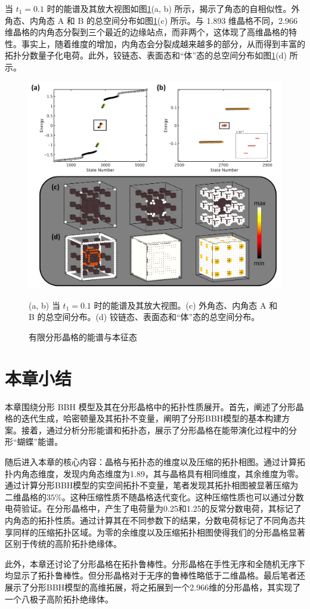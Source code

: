 当 \( t_1=0.1 \) 时的能谱及其放大视图如图\ref{fig:3DState}(a, b) 所示，揭示了角态的自相似性。外角态、内角态 A 和 B 的总空间分布如图\ref{fig:3DState}(c) 所示。与 1.893 维晶格不同，2.966 维晶格的内角态分裂到三个最近的边缘站点，而非两个，这体现了高维晶格的特性。事实上，随着维度的增加，内角态会分裂成越来越多的部分，从而得到丰富的拓扑分数量子化电荷。此外，铰链态、表面态和“体”态的总空间分布如图\ref{fig:3DState}(d) 所示。
\begin{figure}[htbp]
    \centering
    \includegraphics[width=0.75\linewidth]{figure/HOTITheo/3DState.png}
    \caption{有限分形晶格的能谱与本征态}(a, b) 当 \( t_1=0.1 \) 时的能谱及其放大视图。(c) 外角态、内角态 A 和 B 的总空间分布。(d) 铰链态、表面态和“体”态的总空间分布。
    \label{fig:3DState}
\end{figure}

\section{本章小结}
本章围绕分形 BBH 模型及其在分形晶格中的拓扑性质展开。首先，阐述了分形晶格的迭代生成，哈密顿量及其拓扑不变量，阐明了分形BBH模型的基本构建方案。接着，通过分析分形能谱和拓扑态，展示了分形晶格在能带演化过程中的分形“蝴蝶”能谱。

随后进入本章的核心内容：晶格与拓扑态的维度以及压缩的拓扑相图。通过计算拓扑内角态维度，发现内角态维度为1.89，其与晶格具有相同维度，其余维度为零。通过计算分形BBH模型的实空间拓扑不变量，笔者发现其拓扑相图被显著压缩为二维晶格的$35\%$。这种压缩性质不随晶格迭代变化。这种压缩性质也可以通过分数电荷验证。在分形晶格中，产生了电荷量为0.25和1.25的反常分数电荷，其标记了内角态的拓扑性质。通过计算其在不同参数下的结果，分数电荷标记了不同角态共享同样的压缩拓扑区域。为零的余维度以及压缩拓扑相图使得我们的分形晶格显著区别于传统的高阶拓扑绝缘体。

此外，本章还讨论了分形晶格在拓扑鲁棒性。分形晶格在手性无序和全随机无序下均显示了拓扑鲁棒性。但分形晶格对于无序的鲁棒性略低于二维晶格。最后笔者还展示了分形BBH模型的高维拓展，将之拓展到一个2.966维的分形晶格，其实现了一个八极子高阶拓扑绝缘体。